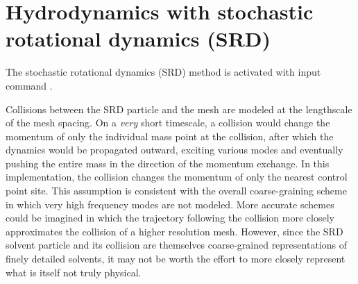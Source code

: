 
\section{ Hydrodynamics with stochastic rotational dynamics (SRD) } \label{sec:srd}

The stochastic rotational dynamics (SRD) method is activated with input command .



Collisions between the SRD particle and the mesh are modeled at the lengthscale of the mesh spacing.
On a {\it very} short timescale, a collision would change the momentum of only the individual mass point at the collision, after which the dynamics would be propagated outward, exciting various modes and eventually pushing the entire mass in the direction of the momentum exchange.
In this implementation, the collision changes the momentum of only the nearest control point site.
This assumption is consistent with the overall coarse-graining scheme in which very high frequency modes are not modeled.
More accurate schemes could be imagined in which the trajectory following the collision more closely approximates the collision of a higher resolution mesh. 
However, since the SRD solvent particle and its collision are themselves coarse-grained representations of finely detailed solvents, it may not be worth the effort to more closely represent what is itself not truly physical.

